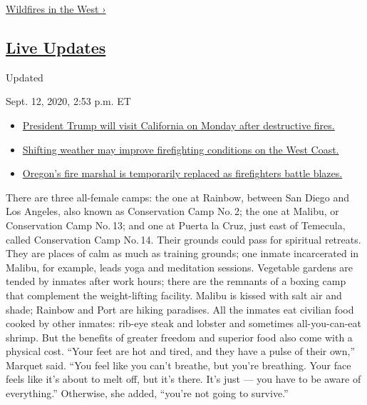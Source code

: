 \href{https://www.nytimes3xbfgragh.onion/spotlight/california-wildfires}{Wildfires
in the West ›}

\hypertarget{live-updates}{%
\subsection{\texorpdfstring{\href{https://www.nytimes3xbfgragh.onion/2020/09/12/us/wildfires-live-updates.html}{Live
Updates}}{Live Updates}}\label{live-updates}}

Updated~

Sept. 12, 2020, 2:53 p.m. ET

\begin{itemize}
\tightlist
\item
  \href{https://www.nytimes3xbfgragh.onion/2020/09/12/us/wildfires-live-updates.html\#link-f3961ff}{President
  Trump will visit California on Monday after destructive fires.}
\item
  \href{https://www.nytimes3xbfgragh.onion/2020/09/12/us/wildfires-live-updates.html\#link-7e503ae9}{Shifting
  weather may improve firefighting conditions on the West Coast.}
\item
  \href{https://www.nytimes3xbfgragh.onion/2020/09/12/us/wildfires-live-updates.html\#link-5e4c548d}{Oregon's
  fire marshal is temporarily replaced as firefighters battle blazes.}
\end{itemize}

There are three all-female camps: the one at Rainbow, between San Diego
and Los Angeles, also known as Conservation Camp No. 2; the one at
Malibu, or Conservation Camp No. 13; and one at Puerta la Cruz, just
east of Temecula, called Conservation Camp No. 14. Their grounds could
pass for spiritual retreats. They are places of calm as much as training
grounds; one inmate incarcerated in Malibu, for example, leads yoga and
meditation sessions. Vegetable gardens are tended by inmates after work
hours; there are the remnants of a boxing camp that complement the
weight-lifting facility. Malibu is kissed with salt air and shade;
Rainbow and Port are hiking paradises. All the inmates eat civilian food
cooked by other inmates: rib-eye steak and lobster and sometimes
all-you-can-eat shrimp. But the benefits of greater freedom and superior
food also come with a physical cost. ``Your feet are hot and tired, and
they have a pulse of their own,'' Marquet said. ``You feel like you
can't breathe, but you're breathing. Your face feels like it's about to
melt off, but it's there. It's just --- you have to be aware of
everything.'' Otherwise, she added, ``you're not going to survive.''

